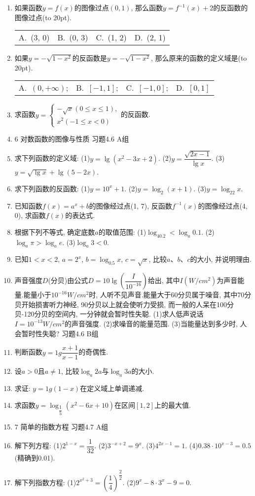 \documentclass[10pt,a4paper]{article}
\newcommand{\bracket}[1]{(\hbox to #1pt{})}
\newcommand{\fourch}[4]{\par\begin{tabular}{p{.23\textwidth}p{.23\textwidth}p{.23\textwidth}p{.23\textwidth}}
A.~#1 &B.~#2& C.~#3& D.~#4
\end{tabular}}
\begin{document}
\begin{enumerate}[1.]
\item 如果函数$y=f(x)$的图像过点$(0, 1)$, 那么函数$y=f^{-1}(x)+2$的反函数的图像过点\bracket{20}.
\fourch{(3, 0)}{(0, 3)}{(1, 2)}{(2, 1)}
\item 如果$y=-\sqrt {1-x^2}$的反函数是$y=-\sqrt {1-x^2}$, 那么原来的函数的定义域是\bracket{20}.
\fourch{$(0,+\infty)$;}{$[-1,1]$;}{$[-1,0]$;}{$[0,1]$}
\item 求函数$y=\begin{cases} -\sqrt x(0\le x\le 1), \\ x^2(-1\le x<0) \end{cases}$的反函数.
\item 6  对数函数的图像与性质
习题4.6  A组
\item 求下列函数的定义域:
(1)$y=\lg (x^2-3x+2)$.				(2)$y=\dfrac{\sqrt {2x-1}}{\lg x}$.
(3)$y=\sqrt {\lg x}+\lg (5-2x)$.
\item 求下列函数的反函数:
(1)$y=10^x+1$.						(2)$y=\log _2(x+1)$.
(3)$y=\log _22x$.
\item 已知函数$f(x)=a^x+b$的图像经过点(1, 7), 反函数$f^{-1}(x)$的图像经过点(4, 0), 求函数$f(x)$的表达式.
\item 根据下列不等式, 确定底数$a$的取值范围:
(1)$\log _40.2<\log _a0.1$.				(2)$\log _a\pi >\log _ae$.
(3)$\log _a3<0$.
\item 已知$1<x<2$, $a=2^x$, $b=\log _{0.5}x$, $c=\sqrt x$, 比较$a$、$b$、$c$的大小, 并说明理由.
\item 声音强度$D$(分贝)由公式$D=10\lg (\dfrac I{10^{-16}})$给出, 其中$I(W/cm^2)$为声音能量.能量小于$10^{-16}W/cm^2$时, 人听不见声音.能量大于60分贝属于噪音, 其中70分贝开始损害听力神经, 90分贝以上就会使听力受损, 而一般的人呆在100分贝-120分贝的空间内, 一分钟就会暂时性失聪.
(1)求人低声说话$I=10^{-13}W/cm^2$的声音强度.
(2)求噪音的能量范围.
(3)当能量达到多少时, 人会暂时性失聪?
习题4.6  B组
\item 判断函数$y=1g\dfrac{x+1}{x-1}$的奇偶性.
\item 设$a>0$且$a\ne 1$, 比较$\log _a2a$与$\log _a3a$的大小.
\item 求证: $y=1g(1-x)$在定义域上单调递减.
\item 求函数$y=\log _{\dfrac 15}(x^2-6x+10)$在区间$[1,2]$上的最大值.
\item 7  简单的指数方程
习题4.7  A组
\item 解下列方程:
(1)$2^{1-x}=\dfrac 1{32}$.						(2)$3^{-x+2}=9^x$.
(3)$4^{2x-1}=1$.						(4)$0.38\cdot 10^{x-3}=0.5$(精确到0.01).
\item 解下列指数方程:
(1)$2^{x^2+3}=(\dfrac 14)^{\dfrac 22}$.					(2)$9^x-8\cdot 3^x-9=0$.

\end{enumerate}
\end{document}

